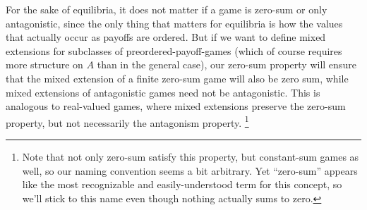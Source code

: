 \documentclass[a4paper]{scrreprt}
\begin{document}
    For the sake of equilibria, it does not matter if a game is zero-sum or only antagonistic, since the only thing that matters for equilibria is how the values that actually occur as payoffs are ordered.
    But if we want to define mixed extensions for subclasses of preordered-payoff-games (which of course requires more structure on $A$ than in the general case), our zero-sum property will ensure that the mixed extension of a finite zero-sum game will also be zero sum, while mixed extensions of antagonistic games need not be antagonistic. This is analogous to real-valued games, where mixed extensions preserve the zero-sum property, but not necessarily the antagonism property.
    \footnote{Note that not only zero-sum satisfy this property, but constant-sum games as well, so our naming convention seems a bit arbitrary.
        Yet “zero-sum” appears like the most recognizable and easily-understood term for this concept, so we'll stick to this name even though nothing actually sums to zero.}
    
\end{document}
